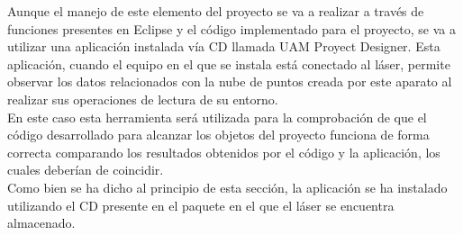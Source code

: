 Aunque el manejo de este elemento del proyecto se va a realizar a través de funciones presentes en Eclipse y el código implementado para el proyecto, se va a utilizar una aplicación instalada vía CD llamada UAM Proyect Designer. Esta aplicación, cuando el equipo en el que se instala está conectado al láser, permite observar los datos relacionados con la nube de puntos creada por este aparato al realizar sus operaciones de lectura de su entorno.\\

En este caso esta herramienta será utilizada para la comprobación de que el código desarrollado para alcanzar los objetos del proyecto funciona de forma correcta comparando los resultados obtenidos por el código y la aplicación, los cuales deberían de coincidir.\\

Como bien se ha dicho al principio de esta sección, la aplicación se ha instalado utilizando el CD presente en el paquete en el que el láser se encuentra almacenado. 